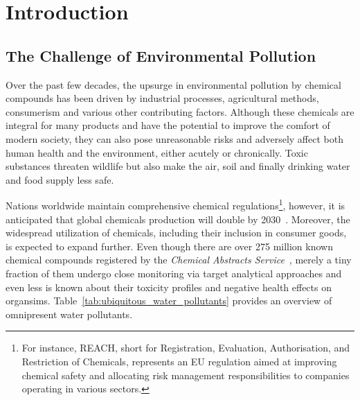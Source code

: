 \chapter{Introduction}\label{chap:introduction}

\section{The Challenge of Environmental Pollution}

Over the past few decades, the upsurge in environmental pollution by chemical compounds has been driven by industrial processes, agricultural methods, consumerism and various other contributing factors. Although these chemicals are integral for many products and have the potential to improve the comfort of modern society, they can also pose unreasonable risks and adversely affect both human health and the environment, either acutely or chronically. Toxic substances threaten wildlife but also make the air, soil and finally drinking water and food supply less safe. 

Nations worldwide maintain comprehensive chemical regulations\footnote{For instance, REACH, short for Registration, Evaluation, Authorisation, and Restriction of Chemicals, represents an EU regulation aimed at improving chemical safety and allocating risk management responsibilities to companies operating in various sectors.}, however, it is anticipated that global chemicals production will double by 2030~\cite{chemicaloutlook}. Moreover, the widespread utilization of chemicals, including their inclusion in consumer goods, is expected to expand further.
Even though there are over 275 million known chemical compounds registered by the \emph{Chemical Abstracts Service}~\cite{CAS}, merely a tiny fraction of them undergo close monitoring via target analytical approaches and even less is known about their toxicity profiles and negative health effects on organsims. Table~\ref{tab:ubiquitous_water_pollutants} provides an overview of omnipresent water pollutants.

